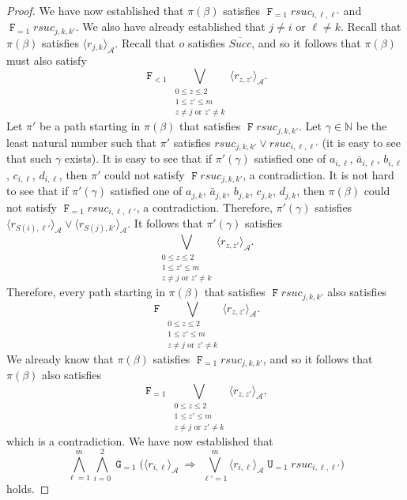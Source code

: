 \documentclass[a4paper,UKenglish,cleveref, autoref, thm-restate]{lipics-v2021}
\newcommand{\A}{\mathcal{A}}
\newcommand{\ex}[1]{\langle #1 \rangle}
\newcommand{\Succ}{\mathit{Succ}}
\newcommand{\rSuc}{\textit{rsuc}}
\newcommand*{\opu}{\operatorname{\pmb{\mathtt{U}}}}
\newcommand*{\opf}{\operatorname{\pmb{\mathtt{F}}}}
\newcommand*{\opg}{\operatorname{\pmb{\mathtt{G}}}}
\newcommand*{\nat}{\mathbb{N}}
\begin{document}
\begin{proof}
We have now established that $\pi(\beta)$ satisfies
$\opf_{=1} rsuc_{i,\ell,\ell'}$ and
$\opf_{=1} rsuc_{j,k,k'}$.
We also have already established that $j \neq i$ or $\ell \neq k$.
Recall that $\pi(\beta)$ satisfies $\ex{r_{j,k}}_{\A}$.
Recall that $o$ satisfies $\overline{\Succ}$,
and so it follows that $\pi(\beta)$ must also satisfy
\[
    \opf_{<1}
    \bigvee_{\substack{
               0 \leq z \leq 2 \\
               1 \leq z' \leq m \\
               z \neq j \text{ or } z' \neq k}
              }
    \ex{r_{z,z'}}_{\A}.
\]
Let $\pi'$ be a path starting in $\pi(\beta)$ that
satisfies $\opf rsuc_{j,k,k'}$.
Let $\gamma \in \nat$ be the least natural number such that $\pi'$
satisfies $rsuc_{j,k,k'} \vee rsuc_{i,\ell,\ell'}$ (it is easy
to see that such $\gamma$ exists).
It is easy to see that if $\pi'(\gamma)$ satisfied one of
$a_{i,\ell}$, $\bar{a}_{i,\ell}$, $b_{i,\ell}$, $c_{i,\ell}$, $d_{i,\ell}$,
then $\pi'$ could not satisfy $\opf rsuc_{j,k,k'}$, a contradiction.
It is not hard to see that if $\pi'(\gamma)$ satisfied one of
$a_{j,k}$, $\bar{a}_{j,k}$, $b_{j,k}$, $c_{j,k}$, $d_{j,k}$,
then $\pi(\beta)$ could not satisfy $\opf_{=1} rsuc_{i,\ell,\ell'}$,
a contradiction.
Therefore, $\pi'(\gamma)$ satisfies $\ex{r_{S(i),\ell'}}_{\A}
\vee \ex{r_{S(j),k'}}_{\A}$.
It follows that $\pi'(\gamma)$ satisfies 
\[
    \bigvee_{\substack{
               0 \leq z \leq 2 \\
               1 \leq z' \leq m \\
               z \neq j \text{ or } z' \neq k}
              }
    \ex{r_{z,z'}}_{\A}.
\]
Therefore, every path starting in $\pi(\beta)$ that
satisfies $\opf rsuc_{j,k,k'}$ also satisfies
\[
    \opf
    \bigvee_{\substack{
               0 \leq z \leq 2 \\
               1 \leq z' \leq m \\
               z \neq j \text{ or } z' \neq k}
              }
    \ex{r_{z,z'}}_{\A}.
\]
We already know that $\pi(\beta)$ satisfies
$\opf_{=1} rsuc_{j,k,k'}$, and so it follows that
$\pi(\beta)$ also satisfies 
\[
  \opf_{=1}
    \bigvee_{\substack{
               0 \leq z \leq 2 \\
               1 \leq z' \leq m \\
               z \neq j \text{ or } z' \neq k}
              }
    \ex{r_{z,z'}}_{\A},
\]
which is a contradiction.
We have now established that
\[
\bigwedge_{\ell=1}^m \bigwedge_{i=0}^2 \opg_{=1} \bigg(  \ex{r_{i,\ell}}_{\A} \ \Rightarrow \ \bigvee_{\ell'=1}^m \ex{r_{i,\ell}}_{\A} \opu_{=1} \rSuc_{i,\ell,\ell'} \bigg)
\]
holds.
\end{proof}
\end{document}
